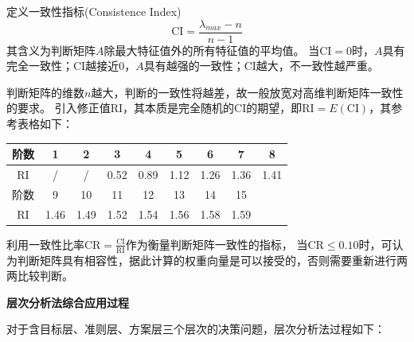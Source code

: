 \documentclass[a4paper,12pt]{article}
\begin{document}
定义一致性指标(Consistence Index)
$$
\text{CI}=\frac{\lambda_{max}-n}{n-1}
$$
其含义为判断矩阵$A$除最大特征值外的所有特征值的平均值。
当$\text{CI}=0$时，$A$具有完全一致性；$\text{CI}$越接近$0$，$A$具有越强的一致性；$\text{CI}$越大，不一致性越严重。

判断矩阵的维数$n$越大，判断的一致性将越差，故一般放宽对高维判断矩阵一致性的要求。
引入修正值$\text{RI}$，其本质是完全随机的$\text{CI}$的期望，即$\text{RI}=E\left(\text{CI}\right)$，其参考表格如下：
\begin{center}
    \begin{tabular}{|c|c|c|c|c|c|c|c|c|}
        \hline
        阶数        & 1    & 2    & 3    & 4    & 5    & 6    & 7    & 8    \\ \hline
        $\text{RI}$ & /    & /    & 0.52 & 0.89 & 1.12 & 1.26 & 1.36 & 1.41 \\ \hline
        阶数        & 9    & 10   & 11   & 12   & 13   & 14   & 15   &      \\ \hline
        $\text{RI}$ & 1.46 & 1.49 & 1.52 & 1.54 & 1.56 & 1.58 & 1.59 &      \\ \hline
    \end{tabular}
\end{center}

利用一致性比率$\text{CR}=\frac{\text{CI}}{\text{RI}}$作为衡量判断矩阵一致性的指标，
当$\text{CR}\le0.10$时，可认为判断矩阵具有相容性，据此计算的权重向量是可以接受的，否则需要重新进行两两比较判断。

\noindent
\textbf{层次分析法综合应用过程}

对于含目标层、准则层、方案层三个层次的决策问题，层次分析法过程如下：
\end{document}
